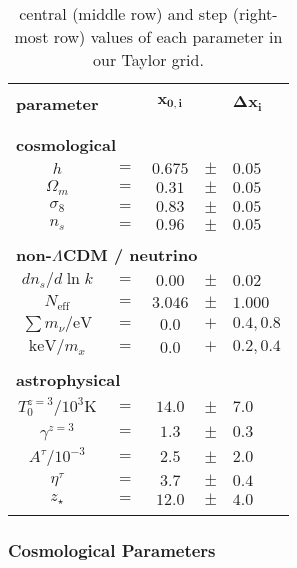 \begin{table}
\begin{center}
\begin{tabular}{ccccl}
\hline \\[-10pt]
\hline \\[-10pt]
\textbf{parameter} &  & $\pmb{x_{0,i}}$ & & $\pmb{\Delta x_i}$ \\[2pt]
\hline \\[-10pt]
\hline \\[-10pt]
\multicolumn{5}{l}{\textbf{cosmological}} \\[2pt]
$h$ & $=$ & $0.675$ & $\pm$ & $0.05$  \\[2pt]
$\Omega_m$ & $=$ & $0.31$ & $\pm$ & $0.05$  \\[2pt]
$\sigma_8$ & $=$ & $0.83$ & $\pm$ & $0.05$  \\[2pt]
$n_s$ & $=$ & $0.96$ & $\pm$ & $0.05$  \\[2pt]
\hline \\[-10pt]
\multicolumn{5}{l}{\textbf{non-$\Lambda$CDM / neutrino}} \\[2pt]
$d n_s / d \ln k$ & $=$ & $0.00$ & $\pm$ & $0.02$  \\[2pt]
$N_{\mathrm{eff}}$ & $=$ & $3.046$ & $\pm$ & $1.000$  \\[2pt]
$\sum m_\nu / \mathrm{eV}$ & $=$ & $0.0$ & $+$ & $0.4,0.8$  \\[2pt]
$\mathrm{keV}/m_x$ & $=$ & $0.0$ & $+$ & $0.2,0.4$  \\[2pt]
\hline \\[-10pt]
\multicolumn{5}{l}{\textbf{astrophysical}} \\[2pt]
$T^{z=3}_0/10^3\mathrm{K}$ & $=$ & $14.0$ & $\pm$ & $7.0$  \\[2pt]
$\gamma^{z=3}$ & $=$ & $1.3$ & $\pm$ & $0.3$  \\[2pt]
$A^\tau / 10^{-3}$ & $=$ & $2.5$ & $\pm$ & $2.0$  \\[2pt]
$\eta^\tau$ & $=$ & $3.7$ & $\pm$ & $0.4$  \\[2pt]
$z_\star$ & $=$ & $12.0$ & $\pm$ & $4.0$  \\[2pt]
\hline \\[-10pt]
\end{tabular}
\end{center}
\caption{central (middle row) and step (right-most row) values of each parameter in our Taylor grid.}
\label{tab:parameter_values}
\end{table}



\subsubsection{Cosmological Parameters}
\label{sec:cosmo_param}

